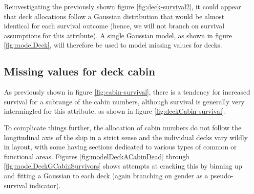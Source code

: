 \documentclass[11.5pt]{article}
\begin{document}
Reinvestigating the previously shown figure \ref{fig:deck-survival2}, it could appear that deck allocations follow a Gaussian distribution that would be almost identical for each survival outcome (hence, we will not branch on survival assumptions for this attribute). A single Gaussian model, as shown in figure \ref{fig:modelDeck},   will therefore be used to model missing values for decks.



\subsection*{Missing values for deck cabin}

As previously shown in figure \ref{fig:cabin-survival}, there is a tendency for increased survival for a subrange of the cabin numbers, although survival is generally very intermingled for this attribute, as shown in figure \ref{fig:deckCabin-survival}.


 To complicate things further, the allocation of cabin numbers do not follow the longitudinal axis of the ship in a strict sense and the individual decks vary wildly in layout, with some having sections dedicated to various types of common or functional areas. Figures \ref{fig:modelDeckACabinDead} through \ref{fig:modelDeckGCabinSurvivors} shows attempts at cracking this by binning up and fitting a Gaussian to each deck (again branching on gender as a pseudo-survival indicator).
\end{document}
